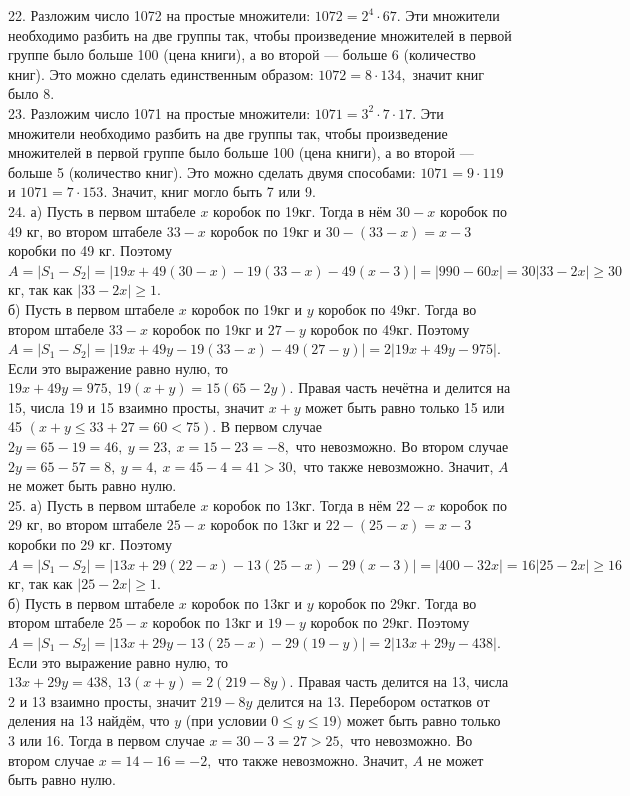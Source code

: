 \documentclass[12pt]{article}
\begin{document}
22. Разложим число 1072 на простые множители: $1072=2^4\cdot67.$ Эти множители необходимо разбить на две группы так, чтобы произведение множителей в первой группе было больше 100 (цена книги), а во второй --- больше 6 (количество книг). Это можно сделать единственным образом: $1072=8\cdot134,$ значит книг было 8.\\
23. Разложим число 1071 на простые множители: $1071=3^2\cdot7\cdot17.$ Эти множители необходимо разбить на две группы так, чтобы произведение множителей в первой группе было больше 100 (цена книги), а во второй --- больше 5 (количество книг). Это можно сделать двумя способами: $1071=9\cdot119$ и $1071=7\cdot153.$ Значит, книг могло быть 7 или 9.\\
24. а) Пусть в первом штабеле $x$ коробок по 19кг. Тогда в нём $30-x$ коробок по 49 кг, во втором штабеле $33-x$ коробок по 19кг и $30-(33-x)=x-3$ коробки по 49 кг.
Поэтому $A=|S_1-S_2|=|19x+49(30-x)-19(33-x)-49(x-3)|=|990-60x|=30|33-2x|\geqslant30$кг, так как $|33-2x|\geqslant1.$\\
б) Пусть в первом штабеле $x$ коробок по 19кг и $y$ коробок по 49кг. Тогда во втором штабеле $33-x$ коробок по 19кг и $27-y$ коробок по 49кг. Поэтому
$A=|S_1-S_2|=|19x+49y-19(33-x)-49(27-y)|=2|19x+49y-975|.$ Если это выражение равно нулю, то $19x+49y=975,\ 19(x+y)=15(65-2y).$ Правая часть нечётна и делится на 15, числа 19 и 15 взаимно просты, значит $x+y$ может быть равно только 15 или 45 $(x+y\leqslant33+27=60<75).$ В первом случае $2y=65-19=46,\ y=23,\ x=15-23=-8,$ что невозможно. Во втором случае $2y=65-57=8,\ y=4,\ x=45-4=41>30,$ что также невозможно. Значит, $A$ не может быть равно нулю.\\
25. а) Пусть в первом штабеле $x$ коробок по 13кг. Тогда в нём $22-x$ коробок по 29 кг, во втором штабеле $25-x$ коробок по 13кг и $22-(25-x)=x-3$ коробки по 29 кг.
Поэтому $A=|S_1-S_2|=|13x+29(22-x)-13(25-x)-29(x-3)|=|400-32x|=16|25-2x|\geqslant16$кг, так как $|25-2x|\geqslant1.$\\
б) Пусть в первом штабеле $x$ коробок по 13кг и $y$ коробок по 29кг. Тогда во втором штабеле $25-x$ коробок по 13кг и $19-y$ коробок по 29кг. Поэтому
$A=|S_1-S_2|=|13x+29y-13(25-x)-29(19-y)|=2|13x+29y-438|.$ Если это выражение равно нулю, то $13x+29y=438,\ 13(x+y)=2(219-8y).$ Правая часть делится на 13, числа 2 и 13 взаимно просты, значит $219-8y$ делится на 13. Перебором остатков от деления на 13 найдём, что $y$ (при условии $0\leqslant y\leqslant19)$ может быть равно только 3 или 16. Тогда в первом случае $x=30-3=27>25,$ что невозможно. Во втором случае $x=14-16=-2,$ что также невозможно. Значит, $A$ не может быть равно нулю.\\
\end{document}
